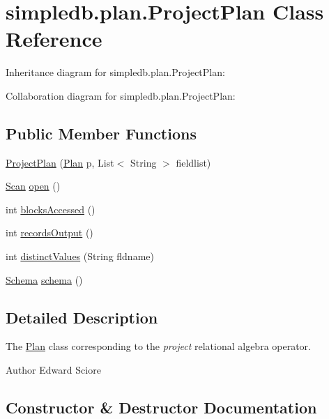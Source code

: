 \hypertarget{classsimpledb_1_1plan_1_1ProjectPlan}{}\section{simpledb.\+plan.\+Project\+Plan Class Reference}
\label{classsimpledb_1_1plan_1_1ProjectPlan}


Inheritance diagram for simpledb.\+plan.\+Project\+Plan\+:


Collaboration diagram for simpledb.\+plan.\+Project\+Plan\+:
\subsection*{Public Member Functions}
\begin{DoxyCompactItemize}
\item 
\hyperlink{classsimpledb_1_1plan_1_1ProjectPlan_a3a1bf93e00a9e1a83e286e38ff473c0a}{Project\+Plan} (\hyperlink{interfacesimpledb_1_1plan_1_1Plan}{Plan} p, List$<$ String $>$ fieldlist)
\item 
\hyperlink{interfacesimpledb_1_1query_1_1Scan}{Scan} \hyperlink{classsimpledb_1_1plan_1_1ProjectPlan_aa63f3cd034d9b00c29210731cc6ff368}{open} ()
\item 
int \hyperlink{classsimpledb_1_1plan_1_1ProjectPlan_a179e4f2151d40cef19af2117bb790112}{blocks\+Accessed} ()
\item 
int \hyperlink{classsimpledb_1_1plan_1_1ProjectPlan_ae62939db691f1180bb17101d48d08f82}{records\+Output} ()
\item 
int \hyperlink{classsimpledb_1_1plan_1_1ProjectPlan_a5a6ec7fd1d13d1ae9f14d81f5d61be56}{distinct\+Values} (String fldname)
\item 
\hyperlink{classsimpledb_1_1record_1_1Schema}{Schema} \hyperlink{classsimpledb_1_1plan_1_1ProjectPlan_a748d16b8055b9b3769e6f0713f1da18f}{schema} ()
\end{DoxyCompactItemize}


\subsection{Detailed Description}
The \hyperlink{interfacesimpledb_1_1plan_1_1Plan}{Plan} class corresponding to the {\itshape project} relational algebra operator. \begin{DoxyAuthor}{Author}
Edward Sciore 
\end{DoxyAuthor}


\subsection{Constructor \& Destructor Documentation}
\mbox{\label{classsimpledb_1_1plan_1_1ProjectPlan_a3a1bf93e00a9e1a83e286e38ff473c0a}} 
